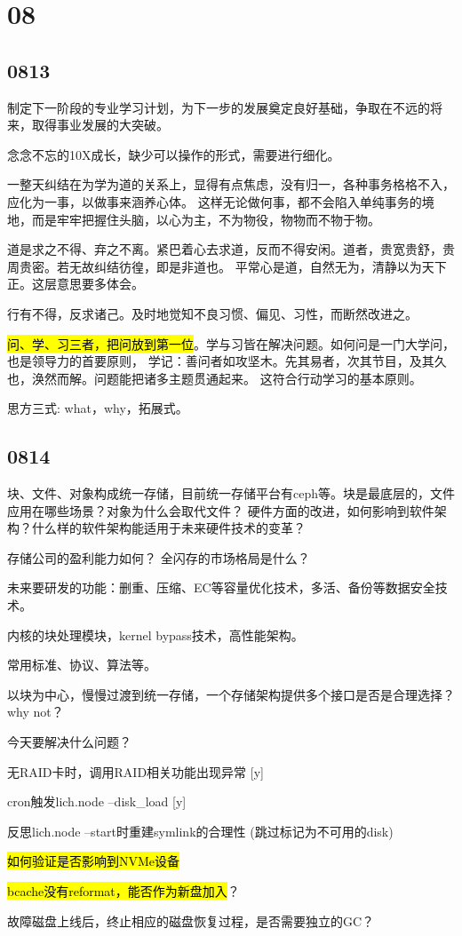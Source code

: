\section{08}

\subsection{0813}

制定下一阶段的专业学习计划，为下一步的发展奠定良好基础，争取在不远的将来，取得事业发展的大突破。

念念不忘的10X成长，缺少可以操作的形式，需要进行细化。

一整天纠结在为学为道的关系上，显得有点焦虑，没有归一，各种事务格格不入，应化为一事，以做事来涵养心体。
这样无论做何事，都不会陷入单纯事务的境地，而是牢牢把握住头脑，以心为主，不为物役，物物而不物于物。

道是求之不得、弃之不离。紧巴着心去求道，反而不得安闲。道者，贵宽贵舒，贵周贵密。若无故纠结彷徨，即是非道也。
平常心是道，自然无为，清静以为天下正。这层意思要多体会。

行有不得，反求诸己。及时地觉知不良习惯、偏见、习性，而断然改进之。

\hl{问、学、习三者，把问放到第一位}。学与习皆在解决问题。如何问是一门大学问，也是领导力的首要原则，
学记：善问者如攻坚木。先其易者，次其节目，及其久也，涣然而解。问题能把诸多主题贯通起来。
这符合行动学习的基本原则。

思方三式: what，why，拓展式。

\subsection{0814}

块、文件、对象构成统一存储，目前统一存储平台有ceph等。块是最底层的，文件应用在哪些场景？对象为什么会取代文件？
硬件方面的改进，如何影响到软件架构？什么样的软件架构能适用于未来硬件技术的变革？

存储公司的盈利能力如何？ 全闪存的市场格局是什么？

未来要研发的功能：删重、压缩、EC等容量优化技术，多活、备份等数据安全技术。

内核的块处理模块，kernel bypass技术，高性能架构。

常用标准、协议、算法等。

以块为中心，慢慢过渡到统一存储，一个存储架构提供多个接口是否是合理选择？why not？

今天要解决什么问题？
\begin{enumbox}
\item 无RAID卡时，调用RAID相关功能出现异常 [y]
\item cron触发lich.node --disk\_load [y]
\item 反思lich.node --start时重建symlink的合理性 (跳过标记为不可用的disk)
\item \hl{如何验证是否影响到NVMe设备}
\item \hl{bcache没有reformat，能否作为新盘加入}？
\item 故障磁盘上线后，终止相应的磁盘恢复过程，是否需要独立的GC？
\end{enumbox}

